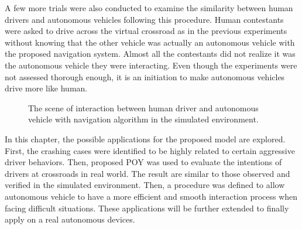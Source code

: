 A few more trials were also conducted to examine the similarity between human drivers and autonomous vehicles following this procedure. Human contestants were asked to drive across the virtual crossroad as in the previous experiments without knowing that the other vehicle was actually an autonomous vehicle with the proposed navigation system. Almost all the contestants did not realize it was the autonomous vehicle they were interacting. Even though the experiments were not assessed thorough enough, it is an initiation to make autonomous vehicles drive more like human. 


\begin{figure}[htbp!]
\begin{center}
\end{center}
\caption{The scene of interaction between human driver and autonomous vehicle with navigation algorithm in the simulated environment.}
\label{fig:screenshot_AVinteraction} 
\end{figure}




In this chapter, the possible applications for the proposed model are explored. First, the crashing cases were identified to be highly related to certain aggressive driver behaviors. Then, proposed POY was used to evaluate the intentions of drivers at crossroads in real world. The result are similar to those observed and verified in the simulated environment. Then, a procedure was defined to allow autonomous vehicle to have a more efficient and smooth interaction process when facing difficult situations. These applications will be further extended to finally apply on a real autonomous devices. 